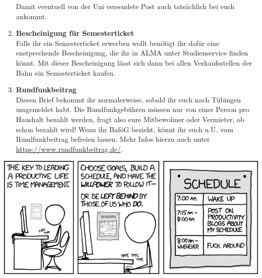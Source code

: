 \begin{enumerate}[label=$\bigcirc$]
		Damit eventuell von der Uni versendete Post auch tatsächlich bei euch ankommt.
	\item \textbf{Bescheinigung für Semesterticket} \\	
		Falls ihr ein Semesterticket erwerben wollt benötigt ihr dafür eine enstprechende Bescheinigung, die ihr in ALMA unter Studienservice finden könnt. Mit dieser Bescheinigung lässt sich dann bei allen Verkaufsstellen der Bahn ein Semesterticket kaufen.
	\item \textbf{Rundfunkbeitrag} \\
		Diesen Brief bekommt ihr normalerweise, sobald ihr euch nach Tübingen umgemeldet habt. Die Rundfunkgebühren müssen nur von einer Person pro Haushalt bezahlt werden, fragt also eure Mitbewohner oder Vermieter, ob schon bezahlt wird! Wenn ihr BaföG bezieht, könnt ihr euch u.U. vom Rundfunkbeitrag befreien lassen. Mehr Infos hierzu auch unter \url{https://www.rundfunkbeitrag.de/}.	%
  \end{enumerate}

\vspace{-1em} %
\begin{center}
\includegraphics[width=0.5\hsize]{info/xkcd/time_management.png}
\end{center}

